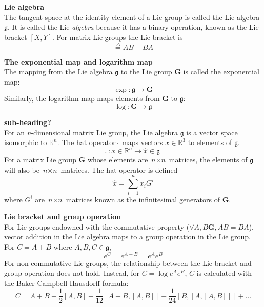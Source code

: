 		\textbf{Lie algebra}\\
			The tangent space at the identity element of a Lie group is called the Lie algebra $\mathfrak{g}$. It is called the Lie \textit{algebra} because it has a binary operation, known as the Lie bracket $[X,Y]$. For matrix Lie groups the Lie bracket is
			\begin{equation}
				[A,B] \stackrel{\Delta}{=} AB-BA
			\end{equation}
			
		\textbf{The exponential map and logarithm map}\\		
			The mapping from the Lie algebra $\mathfrak{g}$ to the Lie group $\mathbf{G}$ is called the exponential map:
			\begin{equation}
				\exp: \mathfrak{g} \rightarrow \mathbf{G}
			\end{equation}			
			Similarly, the logarithm map maps elements from $\mathbf{G}$ to $\mathfrak{g}$:
			\begin{equation}
				\log: \mathbf{G} \rightarrow \mathfrak{g}
			\end{equation}
						
		\textbf{sub-heading?}\\
			For an \textit{n}-dimensional matrix Lie group, the Lie algebra $\mathfrak{g}$ is a vector space isomorphic to $\mathbb{R}^n$. The hat operator $\hat{\:}$ maps vectors $x \in \mathbb{R}^3$ to elements of $\mathfrak{g}$.				
			\begin{equation}
				\hat{\:}: x \in \mathbb{R}^n \rightarrow \hat{x} \in \mathfrak{g}
			\end{equation}		
			For a matrix Lie group $\mathbf{G}$ whose elements are $\textit{n} \times \textit{n}$ matrices, the elements of $\mathfrak{g}$ will also be $\textit{n} \times \textit{n}$ matrices. The hat operator is defined
			\begin{equation}
				\hat{x} = \sum\limits_{i=1}^n x_iG^i 
			\end{equation}
			where $G^i$ are $\textit{n} \times \textit{n}$ matrices known as the infinitesimal generators of $\mathbf{G}$.
						
		\textbf{Lie bracket and group operation}\\					
			For Lie groups endowned with the commutative property ($\forall A,B \mathbf{G}, AB = BA$), vector addition in the Lie algebra maps to a group operation in the Lie group. For $C = A + B$ where $A,B,C \in \mathfrak{g}$,
			\begin{equation}
				e^C = e^{A+B} = e^Ae^B
			\end{equation}
			For non-commutative Lie groups, the relationship between the Lie bracket and group operation does not hold. Instead, for $C = \log{e^Ae^B}$, $C$ is calculated with the Baker-Campbell-Hausdorff formula:
			\begin{equation}
				C = A + B + \frac{1}{2}[A,B] + \frac{1}{12}[A-B,[A,B]] + \frac{1}{24}[B,[A,[A,B]]] + \dots
			\end{equation}	
		
